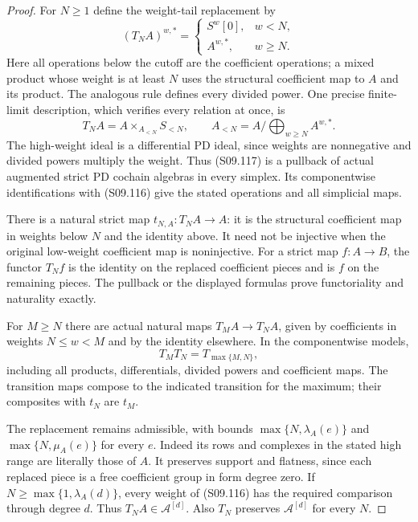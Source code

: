 \begin{proof}
For $N\geq1$ define the weight-tail replacement by
\[
 (T_NA)^{w,*}=
 \begin{cases}
 S^w[0],&w<N,\\
 A^{w,*},&w\geq N.
 \end{cases}
 \tag{S09.116}
\]
Here all operations below the cutoff are the coefficient
operations; a mixed product whose weight is at least $N$
uses the structural coefficient map to $A$ and its product.
The analogous rule defines every divided power.  One precise
finite-limit description, which verifies every relation at once,
is
\[
        T_NA=A\mathop{\times}_{A_{<N}}S_{<N},
       \qquad A_{<N}=A/\!\bigoplus_{w\geq N}A^{w,*}.
 \tag{S09.117}
\]
The high-weight ideal is a differential PD ideal, since weights
are nonnegative and divided powers multiply the weight.
Thus (S09.117) is a pullback of actual augmented strict PD
cochain algebras in every simplex.  Its componentwise
identifications with (S09.116) give the stated operations and
all simplicial maps.

There is a natural strict map
$t_{N,A}:T_NA\to A$: it is the structural coefficient map in
weights below $N$ and the identity above.  It need not be
injective when the original low-weight coefficient map is
noninjective.  For a strict map $f:A\to B$, the functor $T_Nf$
is the identity on the replaced coefficient pieces and is $f$
on the remaining pieces.  The pullback or the displayed formulas
prove functoriality and naturality exactly.

For $M\geq N$ there are actual natural maps
$T_MA\to T_NA$, given by coefficients in weights $N\leq w<M$
and by the identity elsewhere.  In the componentwise models,
\[
                   T_MT_N=T_{\max\{M,N\}},
 \tag{S09.118}
\]
including all products, differentials, divided powers and
coefficient maps.  The transition maps compose to the indicated
transition for the maximum; their composites with $t_N$ are
$t_M$.

The replacement remains admissible, with bounds
$\max\{N,\lambda_A(e)\}$ and
$\max\{N,\mu_A(e)\}$ for every $e$.
Indeed its rows and complexes in the stated high range are
literally those of $A$.  It preserves support and flatness,
since each replaced piece is a free coefficient group in form
degree zero.  If $N\geq\max\{1,\lambda_A(d)\}$, every weight
of (S09.116) has the required comparison through degree $d$.
Thus $T_NA\in\mathcal A^{[d]}$.  Also $T_N$ preserves
$\mathcal A^{[d]}$ for every $N$.


\end{proof}
